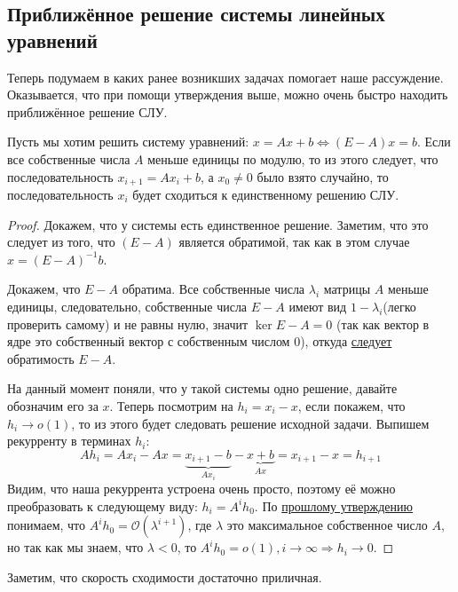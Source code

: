 \subsection{Приближённое решение системы линейных уравнений}
Теперь подумаем в каких ранее возникших задачах помогает наше рассуждение.
Оказывается, что при помощи утверждения выше, можно очень быстро находить приближённое
решение СЛУ.

\begin{statement}
    Пусть мы хотим решить систему уравнений: $x = Ax + b \Leftrightarrow (E - A)x = b$.
    Если все собственные числа $A$ меньше единицы по модулю, то из этого следует, что последовательность
    $x_{i + 1} = Ax_i + b$, а $x_0 \neq 0$ было взято случайно, то последовательность $x_i$ 
    будет сходиться к единственному решению СЛУ.
\end{statement}
\begin{proof}
    Докажем, что у системы есть единственное решение. Заметим, что это следует из того,
    что $(E - A)$ является обратимой, так как в этом случае $x = (E - A)^{-1} b$.

    Докажем, что $E - A$ обратима.
    Все собственные числа $\lambda_i$ матрицы $A$ меньше единицы, следовательно,
    собственные числа $E - A$ имеют вид $1 - \lambda_i$(легко проверить самому)
    и не равны нулю, значит $\ker E - A = 0$
    (так как вектор в ядре это собственный вектор с собственным числом $0$), откуда 
    \hyperref[stm:Базовый критерий обратимости]{следует} обратимость $E - A$.

    На данный момент поняли, что у такой системы одно решение, давайте обозначим его за $x$.
    Теперь посмотрим на $h_i = x_i - x$, если покажем, что $h_i \to o(1)$, то из этого
    будет следовать решение исходной задачи. Выпишем рекурренту в терминах $h_i$:
    \[
        A h_i = A x_i - A x = \underbrace{x_{i + 1} - b}_{Ax_i} - \underbrace{x + b}_{Ax} = 
        x_{i + 1} - x = h_{i + 1}
    \] 
    Видим, что наша рекуррента устроена очень просто, поэтому её можно преобразовать
    к следующему виду: $h_i = A^i h_0$. По \hyperref[stm:Ассимптотическая оценка элементов матрицы]
    {прошлому утверждению} понимаем, что $A^i h_0 = \mathcal{O}(\lambda^{i + 1})$, где $\lambda$
    это максимальное собственное число $A$, но так как мы знаем, что $\lambda < 0$,
    то $A^i h_0 = o(1), i \to \infty \Rightarrow h_i \to 0$.
\end{proof}
\begin{remark}
    Заметим, что скорость сходимости достаточно приличная.
\end{remark}

